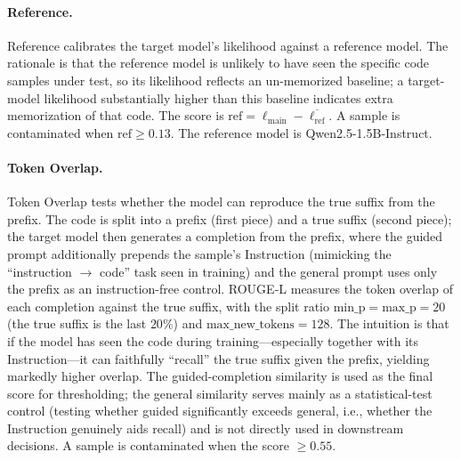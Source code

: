 \paragraph{Reference.}
Reference calibrates the target model's likelihood against a reference model. The rationale is that the reference model is unlikely to have seen the specific code samples under test, so its likelihood reflects an un-memorized baseline; a target-model likelihood substantially higher than this baseline indicates extra memorization of that code. The score is $\mathrm{ref}=\ell_{\mathrm{main}}-\overline{\ell_{\mathrm{ref}}}$. A sample is contaminated when $\mathrm{ref}\ge 0.13$. The reference model is Qwen2.5-1.5B-Instruct.

\paragraph{Token Overlap.}
Token Overlap tests whether the model can reproduce the true suffix from the prefix. The code is split into a prefix (first piece) and a true suffix (second piece); the target model then generates a completion from the prefix, where the guided prompt additionally prepends the sample's Instruction (mimicking the ``instruction $\rightarrow$ code'' task seen in training) and the general prompt uses only the prefix as an instruction-free control. ROUGE-L measures the token overlap of each completion against the true suffix, with the split ratio $\mathrm{min\_p}=\mathrm{max\_p}=20$ (the true suffix is the last $20\%$) and $\mathrm{max\_new\_tokens}=128$. The intuition is that if the model has seen the code during training---especially together with its Instruction---it can faithfully ``recall'' the true suffix given the prefix, yielding markedly higher overlap. The guided-completion similarity is used as the final score for thresholding; the general similarity serves mainly as a statistical-test control (testing whether guided significantly exceeds general, i.e., whether the Instruction genuinely aids recall) and is not directly used in downstream decisions. A sample is contaminated when the score $\ge 0.55$.

